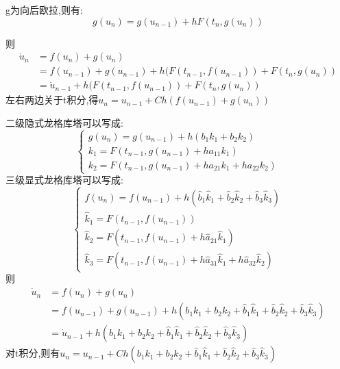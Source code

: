 \documentclass{article}
\begin{document}
\begin{CJK}{UTF8}{gkai}
g为向后欧拉,则有:
\begin{equation}
g(u_{n})=g(u_{n-1})+hF(t_{n},g(u_{n}))
\end{equation}

则
\begin{align}
\dot{u}_{n}&=f(u_{n})+g(u_{n})\\&=f(u_{n-1})+g(u_{n-1})+h(F(t_{n-1},f(u_{n-1}))+F(t_{n},g(u_{n}))\\&=\dot{u}_{n-1}+h(F(t_{n-1},f(u_{n-1}))+F(t_{n},g(u_{n}))
\end{align}
左右两边关于t积分,得$u_{n}=u_{n-1}+Ch(f(u_{n-1})+g(u_{n}))$

二级隐式龙格库塔可以写成:
\begin{equation}
\begin{cases}
g(u_{n})=g(u_{n-1})+h(b_{1}k_{1}+b_{2}k_{2})\\
k_{1}=F(t_{n-1},g(u_{n-1})+ha_{11}k_{1})\\
k_{2}=F(t_{n-1},g(u_{n-1})+ha_{21}k_{1}+ha_{22}k_{2})
\end{cases}
\end{equation}
三级显式龙格库塔可以写成:
\begin{equation}
\begin{cases}
f(u_{n})=f(u_{n-1})+h(\hat{b}_{1}\hat{k}_{1}+\hat{b}_{2}\hat{k}_{2}+\hat{b}_{3}\hat{k}_{3})\\
\hat{k}_{1}=F(t_{n-1},f(u_{n-1}))\\
\hat{k}_{2}=F(t_{n-1},f(u_{n-1})+h\hat{a}_{21}\hat{k}_{1})\\
\hat{k}_{3}=F(t_{n-1},f(u_{n-1})+h\hat{a}_{31}\hat{k}_{1}+h\hat{a}_{32}\hat{k}_{2})
\end{cases}
\end{equation}
则
\begin{align}
\dot{u}_{n}&=f(u_{n})+g(u_{n})\\
&=f(u_{n-1})+g(u_{n-1})+h(b_{1}k_{1}+b_{2}k_{2}+\hat{b}_{1}\hat{k}_{1}+\hat{b}_{2}\hat{k}_{2}+\hat{b}_{3}\hat{k}_{3})\\&
=\dot{u}_{n-1}+h(b_{1}k_{1}+b_{2}k_{2}+\hat{b}_{1}\hat{k}_{1}+\hat{b}_{2}\hat{k}_{2}+\hat{b}_{3}\hat{k}_{3})
\end{align}
对t积分,则有${u}_{n}=u_{n-1}+Ch(b_{1}k_{1}+b_{2}k_{2}+\hat{b}_{1}\hat{k}_{1}+\hat{b}_{2}\hat{k}_{2}+\hat{b}_{3}\hat{k}_{3})$


\end{CJK}
\end{document}
